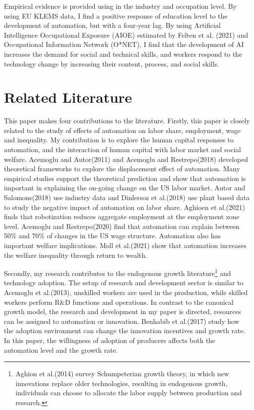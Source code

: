 \documentclass[12pt]{article}
\begin{document}
Empirical evidence is provided using in the industry and occupation level. By using EU KLEMS data, I find a positive response of education level to the development of automation, but with a four-year lag. By using Artificial Intelligence Occupational Exposure (AIOE) estimated by Felten et al. (2021)\cite{Feltenetal2021} and Occupational Information Network (O*NET), I find that the development of AI increases the demand for social and technical skills, and workers respond to the technology change by increasing their content, process, and social skills. 

\clearpage
\section{Related Literature}
This paper makes four contributions to the literature. Firstly, this paper is closely related to the study of effects of automation on labor share, employment, wage and inequality. My contribution is to explore the human capital responses to automation, and the interaction of human capital with labor market and social welfare. Acemoglu and Autor(2011)\cite{AcemogluAutor2011} and Acemoglu and Restrepo(2018)\cite{AcemogluRestrepo2018} developed theoretical frameworks to explore the displacement effect of automation. Many empirical studies support the theoretical prediction and show that automation is important in explaining the on-going change on the US labor market. Autor and Salomons(2018)\cite{AutorSalomons2018} use industry data and Dinlersoz et al.(2018)\cite{Dinlersozetal2018} use plant based data to study the negative impact of automation on labor share. Aghioen et al.(2021)\cite{Aghioenetal2021} finds that robotization reduces aggregate employment at the employment zone level. Acemoglu and Restrepo(2020)\cite{AcemogluRestrepo2020} find that automation can explain between 50\% and 70\% of changes in the US wage structure. Automation also has important welfare implications. Moll et al.(2021)\cite{Molletal2021} show that automation increases the welfare inequality through return to wealth. 

Secondly, my research contributes to the endogenous growth literature\footnote{Aghion et al.(2014)\cite{Aghionetal2014} survey Schumpeterian growth theory, in which new innovations replace older technologies, resulting in endogenous growth, individuals can choose to allocate the labor supply between production and research.} and technology adoption. The setup of research and development sector is similar to Acemoglu et al.(2013)\cite{Acemogluetal2013}, unskilled workers are used in the production, while skilled workers perform R\&D functions and operations. In contrast to the canonical growth model, the research and development in my paper is directed, resources can be assigned to automation or innovation. Benhabib et al.(2017)\cite{Benhabibetal2017} study how the adoption environment can change the innovation incentives and growth rate. In this paper, the willingness of adoption of producers affects both the automation level and the growth rate. 
\end{document}
